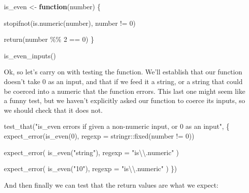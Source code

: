 \documentclass[
  letterpaper,
  DIV=11,
  numbers=noendperiod]{scrreprt}
\newenvironment{Shaded}{\begin{snugshade}}{\end{snugshade}}
\newcommand{\AttributeTok}[1]{\textcolor[rgb]{0.40,0.45,0.13}{#1}}
\newcommand{\ControlFlowTok}[1]{\textcolor[rgb]{0.00,0.23,0.31}{\textbf{#1}}}
\newcommand{\DecValTok}[1]{\textcolor[rgb]{0.68,0.00,0.00}{#1}}
\newcommand{\FunctionTok}[1]{\textcolor[rgb]{0.28,0.35,0.67}{#1}}
\newcommand{\NormalTok}[1]{\textcolor[rgb]{0.00,0.23,0.31}{#1}}
\newcommand{\OtherTok}[1]{\textcolor[rgb]{0.00,0.23,0.31}{#1}}
\newcommand{\SpecialCharTok}[1]{\textcolor[rgb]{0.37,0.37,0.37}{#1}}
\newcommand{\StringTok}[1]{\textcolor[rgb]{0.13,0.47,0.30}{#1}}
\begin{document}
\begin{Shaded}
\begin{Highlighting}[]
\NormalTok{is\_even }\OtherTok{\textless{}{-}} \ControlFlowTok{function}\NormalTok{(number) \{}
  
  \FunctionTok{stopifnot}\NormalTok{(}\FunctionTok{is.numeric}\NormalTok{(number), number }\SpecialCharTok{!=} \DecValTok{0}\NormalTok{)}
  
  \FunctionTok{return}\NormalTok{(number }\SpecialCharTok{\%\%} \DecValTok{2} \SpecialCharTok{==} \DecValTok{0}\NormalTok{)}
\NormalTok{\}}

\FunctionTok{is\_even\_inputs}\NormalTok{()}
\end{Highlighting}
\end{Shaded}

Ok, so let's carry on with testing the function. We'll establish that
our function doesn't take 0 as an input, and that if we feed it a
string, or a string that could be coerced into a numeric that the
function errors. This last one might seem like a funny test, but we
haven't explicitly asked our function to coerce its inputs, so we should
check that it does not.

\begin{Shaded}
\begin{Highlighting}[]
\FunctionTok{test\_that}\NormalTok{(}\StringTok{"is\_even errors if given a non{-}numeric input, or 0 as an input"}\NormalTok{, \{}
  \FunctionTok{expect\_error}\NormalTok{(}\FunctionTok{is\_even}\NormalTok{(}\DecValTok{0}\NormalTok{),}
               \AttributeTok{regexp =}\NormalTok{ stringr}\SpecialCharTok{::}\FunctionTok{fixed}\NormalTok{(}\StringTok{\textquotesingle{}number != 0\textquotesingle{}}\NormalTok{))}
  
  \FunctionTok{expect\_error}\NormalTok{(}
    \FunctionTok{is\_even}\NormalTok{(}\StringTok{"string"}\NormalTok{),}
    \AttributeTok{regexp =} \StringTok{"is}\SpecialCharTok{\textbackslash{}\textbackslash{}}\StringTok{.numeric"}
\NormalTok{  )}
  
  \FunctionTok{expect\_error}\NormalTok{(}
    \FunctionTok{is\_even}\NormalTok{(}\StringTok{"10"}\NormalTok{),}
    \AttributeTok{regexp =} \StringTok{"is}\SpecialCharTok{\textbackslash{}\textbackslash{}}\StringTok{.numeric"}
\NormalTok{  )}
\NormalTok{\})}
\end{Highlighting}
\end{Shaded}

And then finally we can test that the return values are what we expect:
\end{document}
